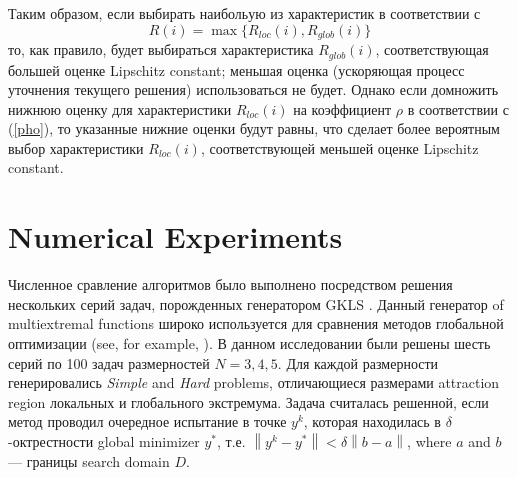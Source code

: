 \documentclass[runningheads]{llncs}
\begin{document}
Таким образом, если выбирать наибольую из характеристик в соответствии с
\[
R(i) = \max\{R_{loc}(i),R_{glob}(i)\}
\]
то, как правило, будет выбираться характеристика $R_{glob}(i)$, соответствующая большей оценке Lipschitz constant; меньшая оценка (ускоряющая процесс уточнения текущего решения) использоваться не будет.
Однако если домножить нижнюю оценку для характеристики $R_{loc}(i)$ на коэффициент $\rho$ в соответствии с (\ref{pho}), то указанные нижние оценки будут равны, что сделает более вероятным выбор характеристики $R_{loc}(i)$, соответствующей меньшей оценке Lipschitz constant.


\section{Numerical Experiments}

Численное сравление алгоритмов было выполнено посредством решения нескольких серий задач, порожденных генератором GKLS \cite{Gaviano2003}. Данный генератор of multiextremal functions широко используется для сравнения методов глобальной оптимизации (see, for example, \cite{Barkalov2018,Paulavicius2014,Sergeyev2015}). В данном исследовании были решены шесть серий по 100 задач размерностей $N = 3,4,5$. Для каждой размерности генерировались \textit{Simple} and \textit{Hard} problems, отличающиеся размерами attraction region локальных и глобального экстремума.
Задача считалась решенной, если метод проводил очередное испытание в точке $y^k$, которая находилась в $\delta$-октрестности global minimizer $y^\ast$, 
т.е. $\left\|y^k-y^\ast\right\| <\delta\left\|b-a\right\|$, where  $a$ and $b$ --- границы search domain $D$.

\end{document}
